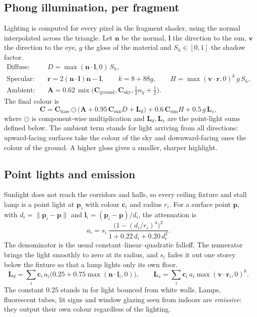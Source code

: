 \documentclass[11pt,a4paper]{article}
\newcommand{\vect}[1]{\mathbf{#1}}
\begin{document}
\subsection{Phong illumination, per fragment}
Lighting is computed for every pixel in the fragment shader, using the
normal interpolated across the triangle. Let $\vect n$ be the normal,
$\vect l$ the direction to the sun, $\vect v$ the direction to the eye, $g$
the gloss of the material and $S_h\in[0,1]$ the shadow factor.
\begin{align}
\text{Diffuse:}\quad & D=\max(\vect n\cdot\vect l,0)\,S_h,\\
\text{Specular:}\quad & \vect r=2(\vect n\cdot\vect l)\vect n-\vect l,\qquad
k=8+88g,\qquad H=\max(\vect v\cdot\vect r,0)^{k}\,g\,S_h,\\
\text{Ambient:}\quad & \vect A=0.62\,\operatorname{mix}\bigl(\vect C_{\mathrm{ground}},\vect C_{\mathrm{sky}},\tfrac12 n_y+\tfrac12\bigr).
\end{align}
The final colour is
\begin{equation}
\vect C=\vect C_{\mathrm{base}}\odot\bigl(\vect A+0.95\,\vect C_{\mathrm{sun}}D+\vect L_d\bigr)
+0.6\,\vect C_{\mathrm{sun}}H+0.5\,g\,\vect L_s ,
\end{equation}
where $\odot$ is component-wise multiplication and $\vect L_d,\vect L_s$ are
the point-light sums defined below. The ambient term stands for light
arriving from all directions: upward-facing surfaces take the colour of the
sky and downward-facing ones the colour of the ground. A higher gloss gives
a smaller, sharper highlight.

\subsection{Point lights and emission}
Sunlight does not reach the corridors and halls, so every ceiling fixture
and stall lamp is a point light at $\vect p_i$ with colour $\vect c_i$ and
radius $r_i$. For a surface point $\vect p$, with $d_i=\lVert\vect p_i-\vect p\rVert$
and $\vect l_i=(\vect p_i-\vect p)/d_i$, the attenuation is
\begin{equation}
a_i=s_i\,\frac{\bigl(1-(d_i/r_i)^4\bigr)^{2}}{1+0.22\,d_i+0.20\,d_i^{2}} .
\end{equation}
The denominator is the usual constant--linear--quadratic falloff. The
numerator brings the light smoothly to zero at its radius, and $s_i$ fades
it out one storey below the fixture so that a lamp lights only its own floor.
\begin{equation}
\vect L_d=\sum_i\vect c_i\,a_i\bigl(0.25+0.75\max(\vect n\cdot\vect l_i,0)\bigr),\qquad
\vect L_s=\sum_i\vect c_i\,a_i\max(\vect v\cdot\vect r_i,0)^{k}.
\end{equation}
The constant $0.25$ stands in for light bounced from white walls. Lamps,
fluorescent tubes, lit signs and window glazing seen from indoors are
\emph{emissive}: they output their own colour regardless of the lighting.
\end{document}
